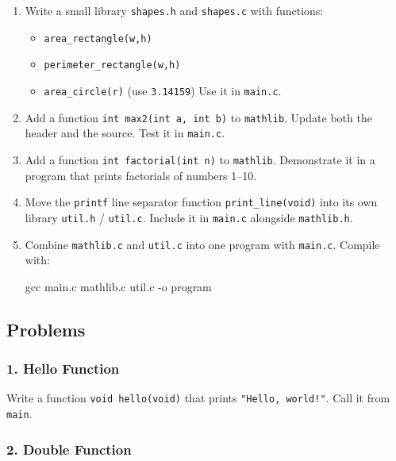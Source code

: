 \documentclass[
  letterpaper,
  DIV=11,
  numbers=noendperiod]{scrreprt}
\newenvironment{Shaded}{\begin{snugshade}}{\end{snugshade}}
\newcommand{\AttributeTok}[1]{\textcolor[rgb]{0.40,0.45,0.13}{#1}}
\newcommand{\FunctionTok}[1]{\textcolor[rgb]{0.28,0.35,0.67}{#1}}
\newcommand{\NormalTok}[1]{\textcolor[rgb]{0.00,0.23,0.31}{#1}}
\providecommand{\tightlist}{%
  \setlength{\itemsep}{0pt}\setlength{\parskip}{0pt}}
\begin{document}
\begin{enumerate}
\def\labelenumi{\arabic{enumi}.}
\item
  Write a small library \texttt{shapes.h} and \texttt{shapes.c} with
  functions:

  \begin{itemize}
  \tightlist
  \item
    \texttt{area\_rectangle(w,h)}
  \item
    \texttt{perimeter\_rectangle(w,h)}
  \item
    \texttt{area\_circle(r)} (use \texttt{3.14159}) Use it in
    \texttt{main.c}.
  \end{itemize}
\item
  Add a function \texttt{int\ max2(int\ a,\ int\ b)} to
  \texttt{mathlib}. Update both the header and the source. Test it in
  \texttt{main.c}.
\item
  Add a function \texttt{int\ factorial(int\ n)} to \texttt{mathlib}.
  Demonstrate it in a program that prints factorials of numbers 1--10.
\item
  Move the \texttt{printf} line separator function
  \texttt{print\_line(void)} into its own library \texttt{util.h} /
  \texttt{util.c}. Include it in \texttt{main.c} alongside
  \texttt{mathlib.h}.
\item
  Combine \texttt{mathlib.c} and \texttt{util.c} into one program with
  \texttt{main.c}. Compile with:

\begin{Shaded}
\begin{Highlighting}[]
\FunctionTok{gcc}\NormalTok{ main.c mathlib.c util.c }\AttributeTok{{-}o}\NormalTok{ program}
\end{Highlighting}
\end{Shaded}
\end{enumerate}

\subsection{Problems}\label{problems-3}

\subsubsection{1. Hello Function}\label{hello-function}

Write a function \texttt{void\ hello(void)} that prints
\texttt{"Hello,\ world!"}. Call it from \texttt{main}.

\subsubsection{2. Double Function}\label{double-function}
\end{document}
